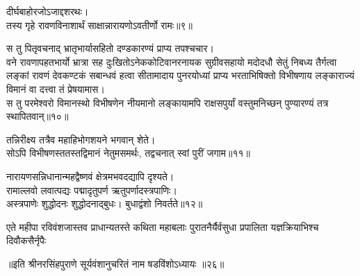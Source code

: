 
\vakta{}
\shrota{}
\notes{}

\storymeta


\addtocounter{shlokacount}{8}


\begin{flushleft}
    
    दीर्घबाहोरजोऽजाद्दशरथः।\\तस्य गृहे रावणविनाशार्थं साक्षान्नारायणोऽवतीर्णो रामः॥९॥
    
    स तु पितृवचनाद् भ्रातृभार्यासहितो दण्डकारण्यं प्राप्य तपश्चचार।\\    
    वने रावणापहतभार्यो भ्रात्रा सह दुःखितोऽनेककोटिवानरनायक सुग्रीवसहायो मदोदधौ सेतुं निबध्य तैर्गत्वा लङ्कां रावणं देवकण्टकं सबान्धवं हत्वा सीतामादाय पुनरयोध्यां प्राप्य भरताभिषिक्तो विभीषणाय लङ्काराज्यं विमानं वा दत्त्वा तं प्रेषयामास।\\    
    स तु परमेश्वरो विमानस्थो विभीषणेन नीयमानो लङ्कायामपि राक्षसपुर्यां वस्तुमनिच्छन् पुण्यारण्यं तत्र स्थापितवान्॥१०॥
    
    तन्निरीक्ष्य तत्रैव महाहिभोगशयने भगवान् शेते।\\
    सोऽपि विभीषणस्ततस्तद्विमानं नेतुमसमर्थः, तद्वचनात् स्वां पुरीं जगाम॥११॥
    
    नारायणसन्निधानान्महद्वैष्णवं क्षेत्रमभवदद्यापि दृश्यते।\\
    रामाल्लवो लवात्पद्यः पद्मादृतुपर्ण ऋतुपर्णादस्त्रपाणिः।\\
    अस्त्रपाणेः शुद्धोदनः शुद्धोदनाद्बुधः। बुधाद्वंशो निवर्तते॥१२॥
\end{flushleft}
\addtocounter{shlokacount}{4}
\twolineshloka
{एते महीपा रविवंशजास्तव प्राधान्यतस्ते कथिता महाबलाः}
{पुरातनैर्यैर्वसुधा प्रपालिता यज्ञक्रियाभिश्च दिवौकसैर्नृपैः} %

॥इति श्रीनरसिंहपुराणे सूर्यवंशानुचरितं नाम षडविंशोऽध्यायः ॥२६॥

\newpage

\vakta{}
\shrota{}

